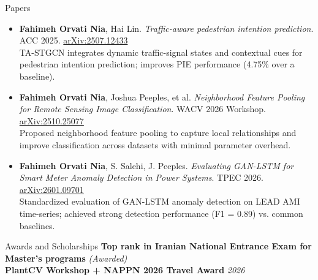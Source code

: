 \documentclass{resume} %
\begin{document}
\begin{rSection}{Papers}
\begin{itemize}
  \item {\bf Fahimeh Orvati Nia}, Hai Lin. \textit{Traffic-aware pedestrian intention prediction}. ACC 2025. \href{https://arxiv.org/abs/2507.12433}{arXiv:2507.12433}\\
  {\small TA-STGCN integrates dynamic traffic-signal states and contextual cues for pedestrian intention prediction; improves PIE performance (4.75\% over a baseline).}
  \item {\bf Fahimeh Orvati Nia}, Joshua Peeples, et al. \textit{Neighborhood Feature Pooling for Remote Sensing Image Classification}. WACV 2026 Workshop. \href{https://arxiv.org/abs/2510.25077}{arXiv:2510.25077}\\
  {\small Proposed neighborhood feature pooling to capture local relationships and improve classification across datasets with minimal parameter overhead.}
  \item {\bf Fahimeh Orvati Nia}, S. Salehi, J. Peeples. \textit{Evaluating GAN-LSTM for Smart Meter Anomaly Detection in Power Systems}. TPEC 2026. \href{https://arxiv.org/abs/2601.09701}{arXiv:2601.09701}\\
  {\small Standardized evaluation of GAN-LSTM anomaly detection on LEAD AMI time-series; achieved strong detection performance (F1 = 0.89) vs. common baselines.}
\end{itemize}
\end{rSection}

\begin{rSection}{Awards and Scholarships}
{\bf Top rank in Iranian National Entrance Exam for Master's programs} \hfill {\em (Awarded)}\\
{\bf PlantCV Workshop + NAPPN 2026 Travel Award} \hfill {\em 2026}
\end{rSection}
\end{document}
